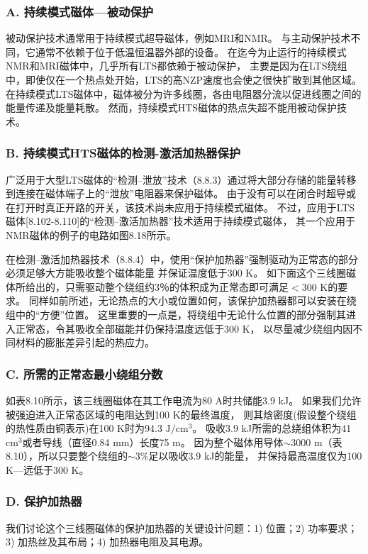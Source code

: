 \subsubsection*{A. 持续模式磁体---被动保护}
被动保护技术通常用于持续模式超导磁体，例如MRI和NMR。 
与主动保护技术不同，它通常不依赖于位于低温恒温器外部的设备。 
在迄今为止运行的持续模式NMR和MRI磁体中，几乎所有LTS都依赖于被动保护，
主要是因为在LTS绕组中，即使仅在一个热点处开始，LTS的高NZP速度也会使之很快扩散到其他区域。
 在持续模式LTS磁体中，磁体被分为许多线圈，各由电阻器分流以促进线圈之间的能量传递及能量耗散。 
 然而，持续模式HTS磁体的热点失超不能用被动保护技术。

\subsubsection*{B. 持续模式HTS磁体的检测-激活加热器保护}
广泛用于大型LTS磁体的“检测--泄放”技术（8.8.3）通过将大部分存储的能量转移到连接在磁体端子上的“泄放”电阻器来保护磁体。
由于没有可以在闭合时超导或在打开时真正开路的开关，该技术尚未应用于持续模式磁体。
不过，应用于LTS磁体[8.102-8.110]的“检测--激活加热器”技术适用于持续模式磁体，
其一个应用于NMR磁体的例子的电路如图8.18所示。

在检测--激活加热器技术（8.8.4）中，使用“保护加热器”强制驱动为正常态的部分必须足够大方能吸收整个磁体能量
并保证温度低于300 K。
如下面这个三线圈磁体所给出的，只需驱动整个绕组约3％的体积成为正常态即可满足$<$300 K的要求。
同样如前所述，无论热点的大小或位置如何，该保护加热器都可以安装在绕组中的“方便”位置。
这里重要的一点是，将绕组中无论什么位置的部分强制其进入正常态，令其吸收全部磁能并仍保持温度远低于300 K，
以尽量减少绕组内因不同材料的膨胀差异引起的热应力。

\subsubsection*{C. 所需的正常态最小绕组分数}
如表8.10所示，该三线圈磁体在其工作电流为80 A时共储能3.9 kJ。
如果我们允许被强迫进入正常态区域的电阻达到100 K的最终温度，
则其焓密度(假设整个绕组的热性质由铜表示)在100 K时为94.3 $\mathrm{J /cm^3}$。
吸收3.9 kJ所需的总绕组体积为41 $\mathrm{cm^3}$或者导线（直径0.84 mm）长度75 m。
 因为整个磁体用导体$\sim$3000 m（表8.10），所以只要整个绕组的$\sim$3\%足以吸收3.9 kJ的能量，
 并保持最高温度仅为100 K---远低于300 K。


\subsubsection*{D. 保护加热器}
我们讨论这个三线圈磁体的保护加热器的关键设计问题：1) 位置；2) 功率要求；3) 加热丝及其布局；4) 加热器电阻及其电源。

